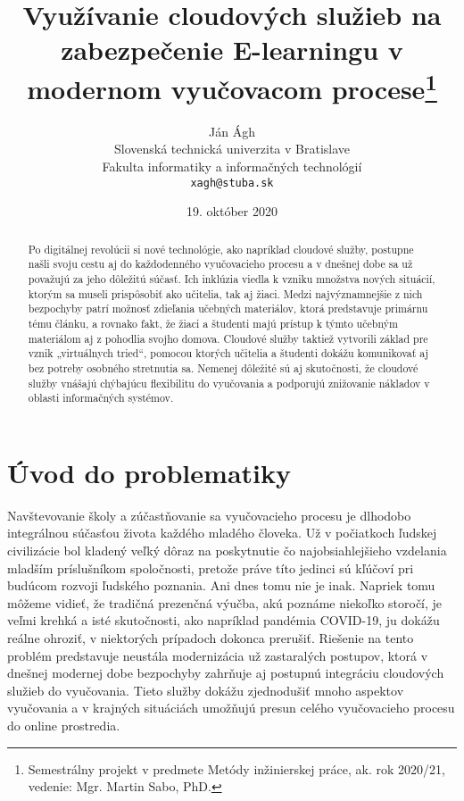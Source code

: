 \documentclass[10pt,slovak,a4paper]{article}%
\title{Využívanie cloudových služieb na zabezpečenie E-learningu v modernom vyučovacom procese\thanks{Semestrálny projekt v predmete Metódy inžinierskej práce, ak. rok 2020/21, vedenie: Mgr. Martin Sabo, PhD.}}
\author{Ján Ágh\\[2pt]
	{\small Slovenská technická univerzita v Bratislave}\\
	{\small Fakulta informatiky a informačných technológií}\\
	{\small \texttt{xagh@stuba.sk}}
	}
\date{\small 19. október 2020}
\begin{document}
\maketitle

\begin{abstract}

Po digitálnej revolúcii si nové technológie, ako napríklad cloudové služby, postupne
našli svoju cestu aj do každodenného vyučovacieho procesu a v dnešnej dobe sa už považujú
za jeho dôležitú súčasť. Ich inklúzia viedla k vzniku množstva nových situácií, ktorým sa
museli prispôsobiť ako učitelia, tak aj žiaci. Medzi najvýznamnejšie z nich bezpochyby patrí
možnosť zdieľania učebných materiálov, ktorá predstavuje primárnu tému článku, a rovnako
fakt, že žiaci a študenti majú prístup k týmto učebným materiálom aj z pohodlia svojho
domova. Cloudové služby taktiež vytvorili základ pre vznik „virtuálnych tried“, pomocou
ktorých učitelia a študenti dokážu komunikovať aj bez potreby osobného stretnutia sa.
Nemenej dôležité sú aj skutočnosti, že cloudové služby vnášajú chýbajúcu flexibilitu do
vyučovania a podporujú znižovanie nákladov v oblasti informačných systémov.
\end{abstract}



\section{Úvod do problematiky}

Navštevovanie školy a zúčastňovanie sa vyučovacieho procesu je dlhodobo integrálnou súčasťou života každého mladého človeka. Už v počiatkoch ľudskej civilizácie bol kladený veľký dôraz na poskytnutie čo najobsiahlejšieho vzdelania mladším príslušníkom spoločnosti, pretože práve títo jedinci sú kľúčoví pri budúcom rozvoji ľudského poznania. Ani dnes tomu nie je inak. Napriek tomu môžeme vidieť, že tradičná prezenčná výučba, akú poznáme niekoľko storočí, je veľmi krehká a isté skutočnosti, ako napríklad pandémia COVID-19, ju dokážu reálne ohroziť, v niektorých prípadoch dokonca prerušiť. Riešenie na tento problém predstavuje neustála modernizácia už zastaralých postupov, ktorá v dnešnej modernej dobe bezpochyby zahrňuje aj postupnú integráciu cloudových služieb do vyučovania\cite{Koutsopoulos_schooloncloud}. Tieto služby dokážu zjednodušiť mnoho aspektov vyučovania a v krajných situáciách umožňujú presun celého vyučovacieho procesu do online prostredia. 
\end{document}
